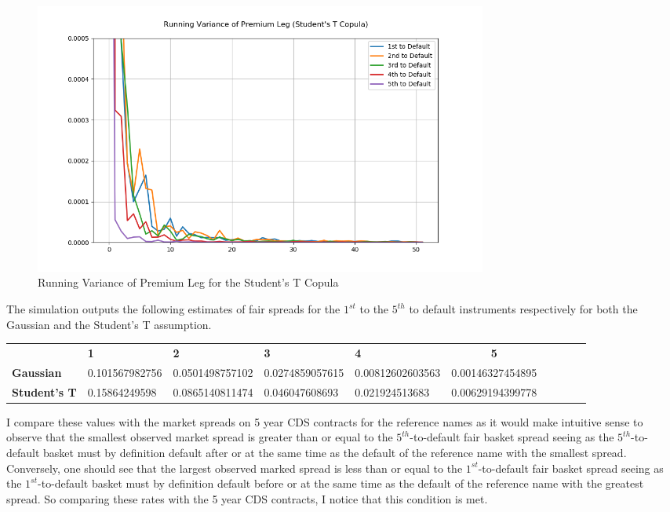 \documentclass{report}
\theoremstyle{plain}
\theoremstyle{definition}
\begin{document}
\begin{figure}[H]
	\begin{center}
		\includegraphics[width=15cm]{Running_Variance_of_Premium_Leg_(Student's_T_Copula).png}
		\caption{Running Variance of Premium Leg for the Student's T Copula} 
		\label{Running_Variance_of_Premium_Leg_(Student's_T_Copula)}
	\end{center}
\end{figure}


The simulation outputs the following estimates of fair spreads for the $1^{st}$ to the $5^{th}$ to default instruments respectively for both the Gaussian and the Student's T assumption.

\begin{center}
	\begin{tabular}{|l|l|l|l|l|c|c|c|c|c|}
		\hline
		& \textbf{1} & \textbf{2} & \textbf{3} & \textbf{4} & \textbf{5}\\\hhline{|=|=|=|=|=|=|}
		\textbf{Gaussian} & 0.101567982756 & 0.0501498757102 & 0.0274859057615 & 0.00812602603563 & 0.00146327454895\\
		\textbf{Student's T} & 0.15864249598 & 0.0865140811474 & 0.046047608693 & 0.021924513683 & 0.00629194399778\\
		\hline
	\end{tabular}
\end{center}


I compare these values with the market spreads on 5 year CDS contracts for the reference names as it would make intuitive sense to observe that the smallest observed market spread is greater than or equal to the $5^{th}$-to-default fair basket spread seeing as the $5^{th}$-to-default basket must by definition default after or at the same time as the default of the reference name with the smallest spread. Conversely, one should see that the largest observed marked spread is less than or equal to the $1^{st}$-to-default fair basket spread seeing as the $1^{st}$-to-default basket must by definition default before or at the same time as the default of the reference name with the greatest spread. So comparing these rates with the 5 year CDS contracts, I notice that this condition is met.\\
\end{document}
